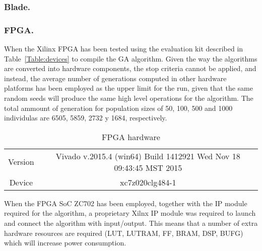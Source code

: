 \subsubsection*{Blade.}

\subsubsection*{FPGA.}




When the Xilinx FPGA has been tested using the evaluation kit described in Table~\ref{Table:devices} to compile the GA algorithm. Given the way the algorithms are converted into hardware components, the stop criteria cannot be applied, and instead, the average number of generations computed in other hardware platforms has been employed as the upper limit for the run, given that the same random seeds will produce the same high level operations for the algorithm.  The total ammount of generation for population sizes of 50, 100, 500 and 1000 individulas are  6505, 5859, 2732 y 1684, respectively.



\begin{table}
\renewcommand{\arraystretch}{1.3}
\centering
\caption{FPGA hardware}
\label{Table:fpga}
\begin{tabular}{cc} \hline
  Version & Vivado v.2015.4 (win64) Build 1412921 Wed Nov 18 09:43:45 MST 2015 \\ 
  Device & xc7z020clg484-1\\
\hline
\end{tabular}
\end{table}

When the FPGA SoC ZC702 has been employed, together with the IP module required for the algorithm, a proprietary Xilnx IP module was required to launch and connect the algorithm with input/output.  This means that a number of extra hardware resources are required (LUT, LUTRAM, FF, BRAM, DSP, BUFG) which will increase power consumption.  


